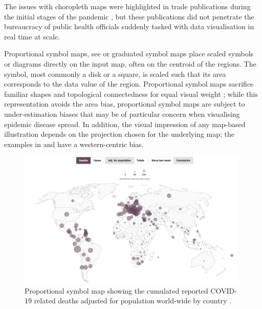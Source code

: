 \documentclass[article]{jdssv}\usepackage[]{graphicx}\usepackage[]{color}
\begin{document}
The issues with choropleth maps were highlighted in trade publications during the initial stages of the pandemic \citep{fieldMappingCoronavirusResponsibly}, but these publications did not penetrate the bureaucracy of public health officials suddenly tasked with data visualisation in real time at scale. 

Proportional symbol maps, see  or graduated symbol maps place scaled symbols or diagrams directly on the input map, often on the centroid of the regions. 
The symbol, most commonly a disk or a square, is scaled such that its area corresponds to the data value of the region. 
Proportional symbol maps sacrifice familiar shapes and topological connectedness for equal visual weight \citep{gaoUsabilityValuebyalphaMaps2019}; while this representation avoids the area bias, proportional symbol maps are subject to under-estimation biases \citep{shimAnalysisMiddleSchool2008} that may be of particular concern when visualising epidemic disease spread.
In addition, the visual impression of any map-based illustration depends on the projection chosen for the underlying map; the examples in  and  have a western-centric bias.


\begin{figure}
	\includegraphics[width = 0.98\textwidth]{Figures_Web/wp_totaldeaths_propsymb.png}
	\caption{Proportional symbol map showing the cumulated reported COVID-19 related deaths adjusted for population world-wide by country \citep{alcantaraMappingWorldwideSpread}.}
	\label{fig:propsymb}
\end{figure}
\end{document}
